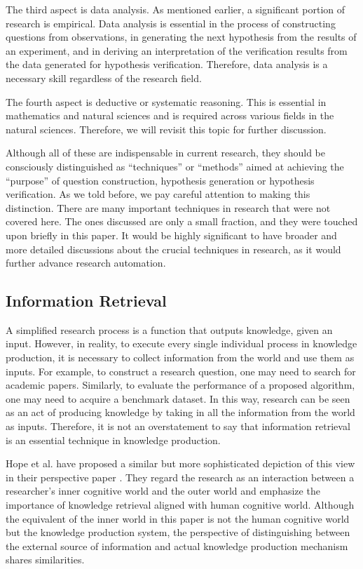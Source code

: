 \documentclass{book}
\begin{document}
The third aspect is data analysis. As mentioned earlier, a significant portion of research is empirical. Data analysis is essential in the process of constructing questions from observations, in generating the next hypothesis from the results of an experiment, and in deriving an interpretation of the verification results from the data generated for hypothesis verification. Therefore, data analysis is a necessary skill regardless of the research field. 

The fourth aspect is deductive or systematic reasoning. This is essential in mathematics and natural sciences and is required across various fields in the natural sciences. Therefore, we will revisit this topic for further discussion. 

Although all of these are indispensable in current research, they should be consciously distinguished as ``techniques'' or ``methods'' aimed at achieving the ``purpose'' of question construction, hypothesis generation or hypothesis verification. As we told before, we pay careful attention to making this distinction. There are many important techniques in research that were not covered here. The ones discussed are only a small fraction, and they were touched upon briefly in this paper. It would be highly significant to have broader and more detailed discussions about the crucial techniques in research, as it would further advance research automation.

\subsection{Information Retrieval}
A simplified research process is a function that outputs knowledge, given an input. However, in reality, to execute every single individual process in knowledge production, it is necessary to collect information from the world and use them as inputs. For example, to construct a research question, one may need to search for academic papers. Similarly, to evaluate the performance of a proposed algorithm, one may need to acquire a benchmark dataset. In this way, research can be seen as an act of producing knowledge by taking in all the information from the world as inputs. Therefore, it is not an overstatement to say that information retrieval is an essential technique in knowledge production. 

Hope et al. have proposed a similar but more sophisticated depiction of this view in their perspective paper \cite{hope2022computational}. They regard the research as an interaction between a researcher’s inner cognitive world and the outer world and emphasize the importance of knowledge retrieval aligned with human cognitive world. Although the equivalent of the inner world in this paper is not the human cognitive world but the knowledge production system, the perspective of distinguishing between the external source of information and actual knowledge production mechanism shares similarities.
\end{document}

